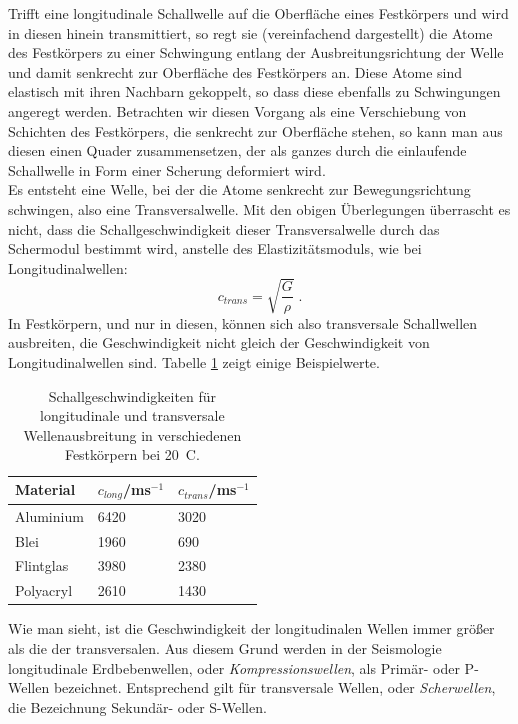 Trifft eine longitudinale Schallwelle auf die Oberfläche eines Festkörpers und wird in diesen hinein transmittiert, so regt sie (vereinfachend dargestellt) die Atome des Festkörpers zu einer Schwingung entlang der Ausbreitungsrichtung der Welle und damit senkrecht zur Oberfläche des Festkörpers an. Diese Atome sind elastisch mit ihren Nachbarn gekoppelt, so dass diese ebenfalls zu Schwingungen angeregt werden. Betrachten wir diesen Vorgang als eine Verschiebung von Schichten des Festkörpers, die senkrecht zur Oberfläche stehen, so kann man aus diesen einen Quader zusammensetzen, der als ganzes durch die einlaufende Schallwelle in Form einer Scherung deformiert wird. \\
Es entsteht eine Welle, bei der die Atome senkrecht zur Bewegungsrichtung schwingen, also eine Transversalwelle. Mit den obigen Überlegungen überrascht es nicht, dass die Schallgeschwindigkeit dieser Transversalwelle durch das Schermodul bestimmt wird, anstelle des Elastizitätsmoduls, wie bei Longitudinalwellen:
\begin{equation}
	c_{trans} = \sqrt{\frac{G}{\rho}}\; .
\end{equation}
In Festkörpern, und nur in diesen, können sich also transversale Schallwellen ausbreiten, die Geschwindigkeit nicht gleich der Geschwindigkeit von Longitudinalwellen sind. Tabelle \ref{tab:Schallgeschwindigkeiten} zeigt einige Beispielwerte.

\begin{table}[hb]
	\centering
		\begin{tabular}{l|l|l}
			Material & $c_{long}$/ms$^{-1}$ & $c_{trans}$/ms$^{-1}$ \\
			\hline
			Aluminium & 6420 & 3020\\
			Blei & 1960 & 690\\
			Flintglas & 3980 & 2380\\
			Polyacryl & 2610 & 1430\\
		\end{tabular}
	\caption{Schallgeschwindigkeiten für longitudinale und transversale Wellenausbreitung in verschiedenen Festkörpern bei 20\degree~C.}
	\label{tab:Schallgeschwindigkeiten}
\end{table}

Wie man sieht, ist die Geschwindigkeit der longitudinalen Wellen immer größer als die der transversalen. Aus diesem Grund werden in der Seismologie longitudinale Erdbebenwellen, oder \textit{Kompressionswellen}, als Primär- oder P-Wellen bezeichnet. Entsprechend gilt für transversale Wellen, oder \textit{Scherwellen}, die Bezeichnung Sekundär- oder S-Wellen.\\

